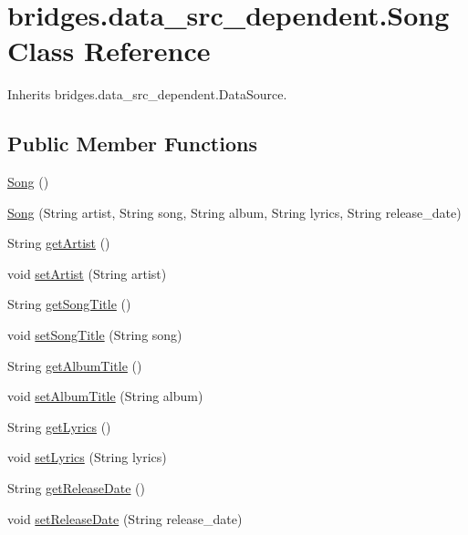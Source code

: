 \hypertarget{classbridges_1_1data__src__dependent_1_1_song}{}\section{bridges.\+data\+\_\+src\+\_\+dependent.\+Song Class Reference}
\label{classbridges_1_1data__src__dependent_1_1_song}


Inherits bridges.\+data\+\_\+src\+\_\+dependent.\+Data\+Source.

\subsection*{Public Member Functions}
\begin{DoxyCompactItemize}
\item 
\mbox{\hyperlink{classbridges_1_1data__src__dependent_1_1_song_a824052caca0b9c03d07c42e9e7740020}{Song}} ()
\item 
\mbox{\hyperlink{classbridges_1_1data__src__dependent_1_1_song_a78506e63f4d91dc1f0d821050a093ad6}{Song}} (String artist, String song, String album, String lyrics, String release\+\_\+date)
\item 
String \mbox{\hyperlink{classbridges_1_1data__src__dependent_1_1_song_a7aa3685df74e4fbb5e0d4d4750cf7685}{get\+Artist}} ()
\item 
void \mbox{\hyperlink{classbridges_1_1data__src__dependent_1_1_song_adffaec742bf945ec8c81244fdafd47d2}{set\+Artist}} (String artist)
\item 
String \mbox{\hyperlink{classbridges_1_1data__src__dependent_1_1_song_a4e7b8aed1aec243f2798a30e51091d72}{get\+Song\+Title}} ()
\item 
void \mbox{\hyperlink{classbridges_1_1data__src__dependent_1_1_song_a9d7540c0e6cca53ae3a105885aac5622}{set\+Song\+Title}} (String song)
\item 
String \mbox{\hyperlink{classbridges_1_1data__src__dependent_1_1_song_a94b26a355aa1e30938bcc896a8bd902f}{get\+Album\+Title}} ()
\item 
void \mbox{\hyperlink{classbridges_1_1data__src__dependent_1_1_song_ab9f9d24be49c3a0a66c9ff9e271b007e}{set\+Album\+Title}} (String album)
\item 
String \mbox{\hyperlink{classbridges_1_1data__src__dependent_1_1_song_ab4aa2c51f7fdce80d9c178d6f0e0aae8}{get\+Lyrics}} ()
\item 
void \mbox{\hyperlink{classbridges_1_1data__src__dependent_1_1_song_a30889eb971f474e9d62782ddb82c1846}{set\+Lyrics}} (String lyrics)
\item 
String \mbox{\hyperlink{classbridges_1_1data__src__dependent_1_1_song_a05520675a0a2f2e60583887b8c69cde4}{get\+Release\+Date}} ()
\item 
void \mbox{\hyperlink{classbridges_1_1data__src__dependent_1_1_song_a6534e543a295b29858cf98be7a4e276e}{set\+Release\+Date}} (String release\+\_\+date)
\end{DoxyCompactItemize}


